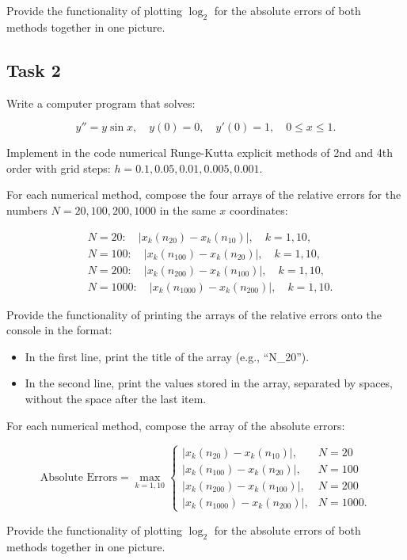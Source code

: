\documentclass{article}
\begin{document}
Provide the functionality of plotting \(\log_2\) for the absolute errors of both methods together in one picture.

\subsection*{Task 2}

Write a computer program that solves:

\[
y'' = y \sin x, \quad y(0) = 0, \quad y'(0) = 1, \quad 0 \leq x \leq 1.
\]

Implement in the code numerical Runge-Kutta explicit methods of 2nd and 4th order with grid steps:
\( h = 0.1, 0.05, 0.01, 0.005, 0.001 \).

For each numerical method, compose the four arrays of the relative errors for the numbers \( N = 20, 100, 200, 1000 \) in the same \( x \) coordinates:

\[
\begin{aligned}
    & N = 20: \quad |x_k(n_{20}) - x_k(n_{10})|, \quad k = 1, 10, \\
    & N = 100: \quad |x_k(n_{100}) - x_k(n_{20})|, \quad k = 1, 10, \\
    & N = 200: \quad |x_k(n_{200}) - x_k(n_{100})|, \quad k = 1, 10, \\
    & N = 1000: \quad |x_k(n_{1000}) - x_k(n_{200})|, \quad k = 1, 10.
\end{aligned}
\]

Provide the functionality of printing the arrays of the relative errors onto the console in the format:

\begin{itemize}
    \item In the first line, print the title of the array (e.g., ``N\_20'').
    \item In the second line, print the values stored in the array, separated by spaces, without the space after the last item.
\end{itemize}

For each numerical method, compose the array of the absolute errors:

\[
\text{Absolute Errors} =
\max_{k=1,10}
\begin{cases}
    |x_k(n_{20}) - x_k(n_{10})|, & N = 20 \\
    |x_k(n_{100}) - x_k(n_{20})|, & N = 100 \\
    |x_k(n_{200}) - x_k(n_{100})|, & N = 200 \\
    |x_k(n_{1000}) - x_k(n_{200})|, & N = 1000.
\end{cases}
\]

Provide the functionality of plotting \(\log_2\) for the absolute errors of both methods together in one picture.
\end{document}
